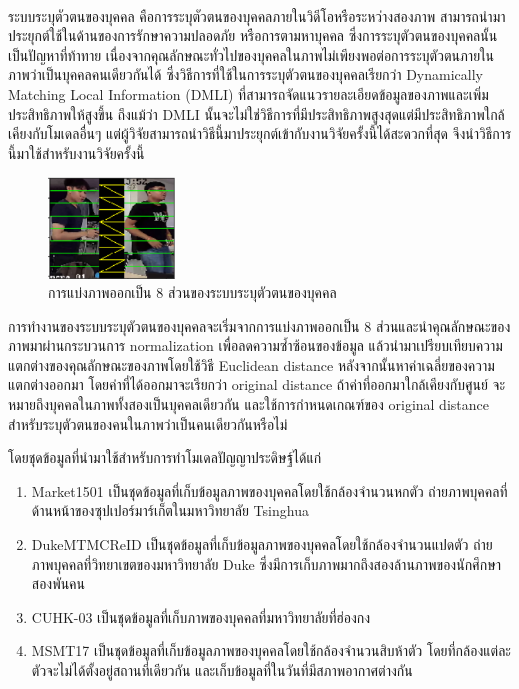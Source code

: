 ระบบระบุตัวตนของบุคคล\textsuperscript{\cite{luo2019alignedreid++}}\textsuperscript{\cite{zhang2017alignedreid}} คือการระบุตัวตนของบุคคลภายในวิดีโอหรือระหว่างสองภาพ สามารถนำมาประยุกต์ใช้ในด้านของการรักษาความปลอดภัย 
หรือการตามหาบุคคล ซึ่งการระบุตัวตนของบุคคลนั้นเป็นปัญหาที่ท้าทาย เนื่องจากคุณลักษณะทั่วไปของบุคคลในภาพไม่เพียงพอต่อการระบุตัวตนภายในภาพว่าเป็นบุคคลคนเดียวกันได้ ซึ่งวิธีการที่ใช้ในการระบุตัวตนของบุคคลเรียกว่า 
Dynamically Matching Local Information (DMLI) ที่สามารถจัดแนวรายละเอียดข้อมูลของภาพและเพิ่มประสิทธิภาพให้สูงขึ้น 
ถึงแม้ว่า DMLI นั้นจะไม่ใช่วิธีการที่มีประสิทธิภาพสูงสุดแต่มีประสิทธิภาพใกล้เคียงกับโมเดลอื่นๆ แต่ผู้วิจัยสามารถนำวิธีนี้มาประยุกต์เข้ากับงานวิจัยครั้งนี้ได้สะดวกที่สุด จึงนำวิธีการนี้มาใช้สำหรับงานวิจัยครั้งนี้

\begin{figure}[!ht]
	\centering
	\includegraphics[width=0.3\textwidth]{chapter2/images/alignedreid.png}
		\caption{การแบ่งภาพออกเป็น 8 ส่วนของระบบระบุตัวตนของบุคคล}
    	\label{fig:alignedreid}
\end{figure}

การทำงานของระบบระบุตัวตนของบุคคลจะเริ่มจากการแบ่งภาพออกเป็น 8 ส่วนและนำคุณลักษณะของภาพมาผ่านกระบวนการ normalization เพื่อลดความซ้ำซ้อนของข้อมูล 
แล้วนำมาเปรียบเทียบความแตกต่างของคุณลักษณะของภาพโดยใช้วิธี Euclidean distance หลังจากนั้นหาค่าเฉลี่ยของความแตกต่างออกมา โดยค่าที่ได้ออกมาจะเรียกว่า original distance ถ้าค่าที่ออกมาใกล้เคียงกับศูนย์
จะหมายถึงบุคคลในภาพทั้งสองเป็นบุคคลเดียวกัน และใช้การกำหนดเกณฑ์ของ original distance สำหรับระบุตัวตนของคนในภาพว่าเป็นคนเดียวกันหรือไม่

โดยชุดข้อมูลที่นำมาใช้สำหรับการทำโมเดลปัญญาประดิษฐ์ได้แก่
\begin{enumerate}
	\item{Market1501 เป็นชุดข้อมูลที่เก็บข้อมูลภาพของบุคคลโดยใช้กล้องจำนวนหกตัว ถ่ายภาพบุคคลที่ด้านหน้าของซุปเปอร์มาร์เก็ตในมหาวิทยาลัย Tsinghua}
	\item{DukeMTMCReID เป็นชุดข้อมูลที่เก็บข้อมูลภาพของบุคคลโดยใช้กล้องจำนวนแปดตัว ถ่ายภาพบุคคลที่วิทยาเขตของมหาวิทยาลัย Duke ซึ่งมีการเก็บภาพมากถึงสองล้านภาพของนักศึกษาสองพันคน }
	\item{CUHK-03 เป็นชุดข้อมูลที่เก็บภาพของบุคคลที่มหาวิทยาลัยที่ฮ่องกง}
	\item{MSMT17 เป็นชุดข้อมูลที่เก็บข้อมูลภาพของบุคคลโดยใช้กล้องจำนวนสิบห้าตัว โดยที่กล้องแต่ละตัวจะไม่ได้ตั้งอยู่สถานที่เดียวกัน และเก็บข้อมูลที่ในวันที่มีสภาพอากาศต่างกัน}
\end{enumerate}

